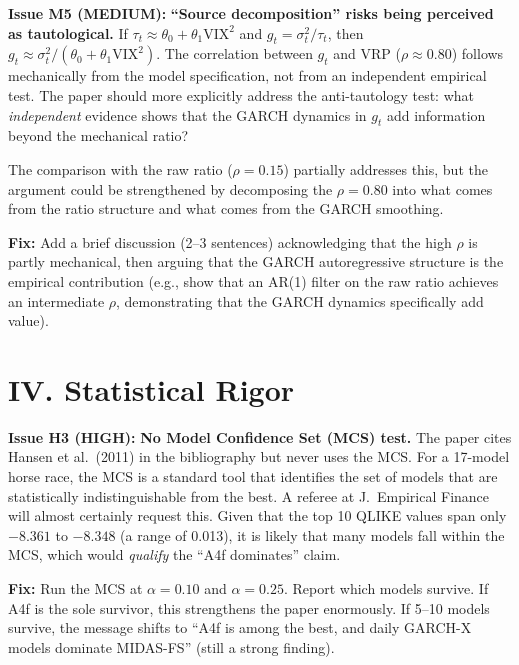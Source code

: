 \documentclass[12pt,a4paper]{article}
\begin{document}
\textcolor{warncolor}{\textbf{Issue M5 (MEDIUM):}} \textbf{``Source decomposition'' risks being perceived as tautological.} If $\tau_t \approx \theta_0 + \theta_1 \mathrm{VIX}^2$ and $g_t = \sigma_t^2 / \tau_t$, then $g_t \approx \sigma_t^2 / (\theta_0 + \theta_1 \mathrm{VIX}^2)$. The correlation between $g_t$ and VRP ($\rho \approx 0.80$) follows mechanically from the model specification, not from an independent empirical test. The paper should more explicitly address the anti-tautology test: what \emph{independent} evidence shows that the GARCH dynamics in $g_t$ add information beyond the mechanical ratio?

The comparison with the raw ratio ($\rho = 0.15$) partially addresses this, but the argument could be strengthened by decomposing the $\rho = 0.80$ into what comes from the ratio structure and what comes from the GARCH smoothing.

\textbf{Fix:} Add a brief discussion (2--3 sentences) acknowledging that the high $\rho$ is partly mechanical, then arguing that the GARCH autoregressive structure is the empirical contribution (e.g., show that an AR(1) filter on the raw ratio achieves an intermediate $\rho$, demonstrating that the GARCH dynamics specifically add value).


\section*{IV. Statistical Rigor}

\textcolor{errorred}{\textbf{Issue H3 (HIGH):}} \textbf{No Model Confidence Set (MCS) test.} The paper cites Hansen et al.\ (2011) in the bibliography but never uses the MCS. For a 17-model horse race, the MCS is a standard tool that identifies the set of models that are statistically indistinguishable from the best. A referee at J.\ Empirical Finance will almost certainly request this. Given that the top 10 QLIKE values span only $-8.361$ to $-8.348$ (a range of 0.013), it is likely that many models fall within the MCS, which would \emph{qualify} the ``A4f dominates'' claim.

\textbf{Fix:} Run the MCS at $\alpha = 0.10$ and $\alpha = 0.25$. Report which models survive. If A4f is the sole survivor, this strengthens the paper enormously. If 5--10 models survive, the message shifts to ``A4f is among the best, and daily GARCH-X models dominate MIDAS-FS'' (still a strong finding).
\end{document}
